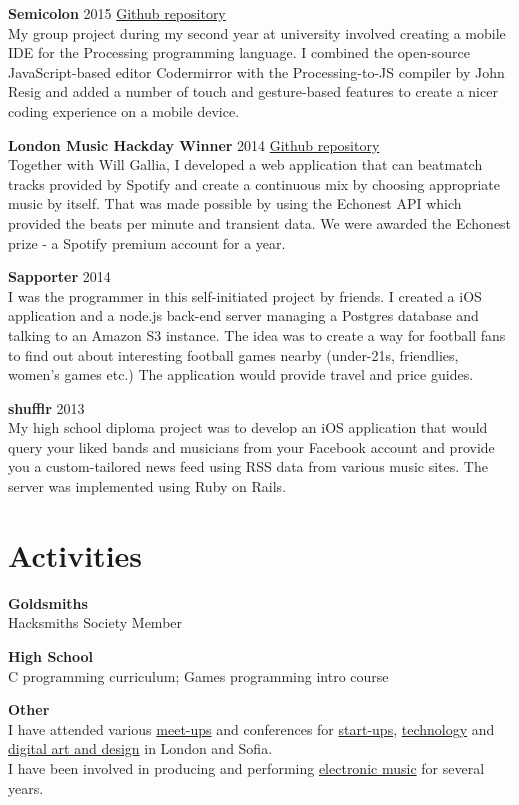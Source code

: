\documentclass[margin,line,a4paper]{resume}
\begin{document}
\begin{resume}
\textbf{Semicolon} 2015 \hfill
\href{https://github.com/nicknikolov/semicolon}{Github repository} \\
My group project during my second year at university involved creating a mobile IDE for the Processing programming language. I combined the open-source JavaScript-based editor Codermirror with the Processing-to-JS compiler by John Resig and added a number of touch and gesture-based features to create a nicer coding experience on a mobile device.

\textbf{London Music Hackday Winner} 2014 \hfill
\href{https://github.com/whg/spotijay}{Github repository} \\
Together with Will Gallia, I developed a web application that can beatmatch tracks provided by Spotify and create a continuous mix by choosing appropriate music by itself. That was made possible by using the Echonest API which provided the beats per minute and transient data. We were awarded the Echonest prize - a Spotify premium account for a year.

\textbf{Sapporter} 2014 \\
I was the programmer in this self-initiated project by friends. I created a iOS application and a node.js back-end server managing a Postgres database and talking to an Amazon S3 instance. The idea was to create a way for football fans to find out about interesting football games nearby (under-21s, friendlies, women's games etc.)
The application would provide travel and price guides.

\textbf{shufflr} 2013 \\
My high school diploma project was to develop an iOS application that would query your liked bands and musicians from your Facebook account and provide you a custom-tailored news feed using RSS data from various music sites.
The server was implemented using Ruby on Rails. \\

\section{\mysidestyle Activities}

\textbf{Goldsmiths} \\
Hacksmiths Society Member

\textbf{High School} \\
C programming curriculum; Games programming intro course

\textbf{Other} \\
I have attended various \href{http://www.meetup.com/HNLondon/}{meet-ups} and conferences for \href{http://www.startupschool.org/}{start-ups}, \href{https://en.wikipedia.org/wiki/Digitalk}{technology} and \href{http://www.alpha-ville.co.uk/exchange/}{digital art and design} in London and Sofia. \\
I have been involved in producing and performing \href{https://soundcloud.com/nick-nikolov}{electronic music} for several years.

\end{resume}
\end{document}
